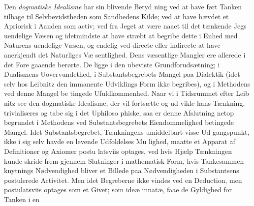 \documentclass[12pt,a4paper]{book}
\begin{document}
Den \emph{dogmatiske Idealisme} har sin blivende Betyd\-%
ning ved at have ført Tanken tilbage til Selvbevidstheden som
Sandhedens Kilde; ved at have hævdet et Apriorisk i Aanden
som activ; ved fra Jeget at være naaet til det tænkende Jegs
uendelige Væsen og idetmindste at have stræbt at begribe
dette i Enhed med Naturens uendelige Væsen, og endelig ved
directe eller indirecte at have anerkjendt det Naturliges Væ\-%
sentlighed. Dens væsentlige Mangler ere allerede i det Fore\-%
gaaende berørte. De ligge i den ubeviste Grundforudsætning;
i Dualismens Uovervundethed, i Substantsbegrebets Mangel paa
Dialektik (idet selv hos Leibnitz den immanente Udviklings
Form ikke begribes), og i Methodens ved denne Mangel be\-%
tingede Ufuldkommenhed. Naar vi i Tidsrummet efter Leib\-%
nitz see den dogmatiske Idealisme, der vil fortsætte og ud\-%
vikle hans Tænkning, trivialiseres og tabe sig i det Uphiloso\-%
phiske, saa er denne Afslutning netop begrundet i Methodens
ved Substantsbegrebets Eiendommelighed betingede Mangel.
Idet Substantsbegrebet, Tænkningens umiddelbart visse Ud\-%
gangspunkt, ikke i sig selv havde en levende Udfoldelses Mu\-%
lighed, maatte et Apparat af Definitioner og Axiomer postu\-%
latsviis optages, ved hvis Hjælp Tænkningen kunde skride frem
gjennem Slutninger i mathematisk Form, hvis Tankesammen\-%
knytnings Nødvendighed bliver et Billede paa Nødvendigheden
i Substantsens postulerede Activitet. Men idet Begreberne ikke
vindes ved en Deduction, men postulatsviis optages som et
Givet; som ideæ innatæ, faae de Gyldighed for Tanken i en
\end{document}
